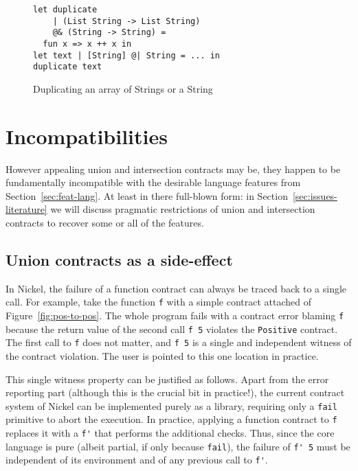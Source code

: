 \documentclass[sigplan,10pt,review,anonymous]{acmart}
\newcommand{\nickel}[1]{\lstinline[language=nickel]{#1}}
\begin{document}
\begin{figure}[h]
\begin{lstlisting}[language=nickel]
let duplicate
    | (List String -> List String)
    @& (String -> String) =
  fun x => x ++ x in
let text | [String] @| String = ... in
duplicate text
\end{lstlisting}
\caption{Duplicating an array of Strings or a String}
\label{fig:intersection-overloading-ex}
\end{figure}

\section{Incompatibilities}
\label{sec:issues-sem}

However appealing union and intersection contracts may be, they happen
to be fundamentally incompatible with the desirable language
features from Section~\ref{sec:feat-lang}. At least in there
full-blown form: in Section~\ref{sec:issues-literature} we will
discuss pragmatic restrictions of union and intersection contracts to
recover some or all of the features.

\subsection{Union contracts as a side-effect}

In Nickel, the failure of a function contract can always be traced back to a
single call. For example, take the function \nickel{f} with a simple contract
attached of Figure~\ref{fig:pos-to-pos}. The whole program fails with a contract
error blaming \nickel{f} because the return value of the second call \nickel{f 5}
violates the \nickel{Positive} contract. The first call to \nickel{f} does
not matter, and \nickel{f 5} is a single and independent witness of the contract
violation. The user is pointed to this one location in practice.

This single witness property can be justified as follows. Apart from the error
reporting part (although this is the crucial bit in practice!), the current
contract system of Nickel can be implemented purely as a library, requiring only
a \nickel{fail} primitive to abort the execution. In practice, applying a
function contract to \nickel{f} replaces it with a \nickel{f'} that performs the
additional checks. Thus, since the core language is pure (albeit
partial, if only because \nickel{fail}), the failure of \nickel{f' 5}
must be independent of its environment and of any previous call to \nickel{f'}.
\end{document}
